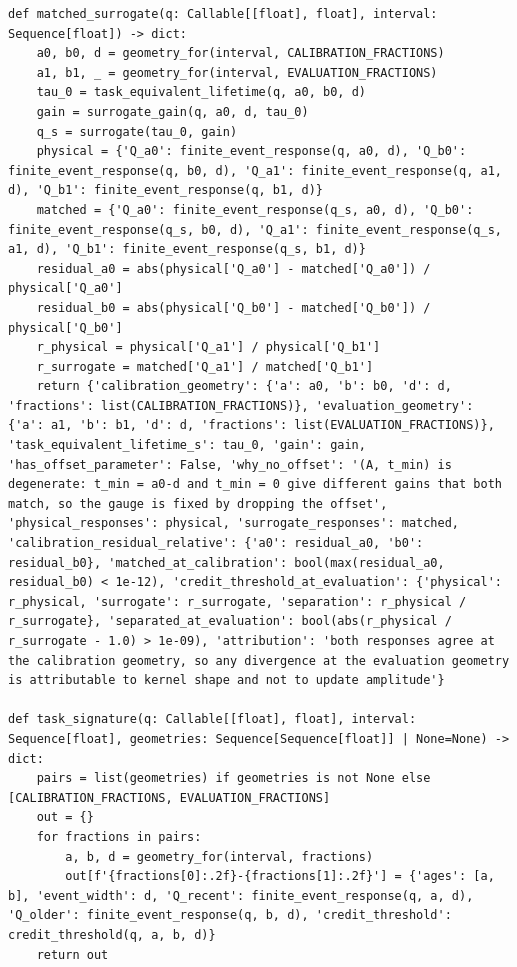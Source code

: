 \documentclass[a4paper,10pt]{article}
\begin{document}
\begin{Verbatim}
def matched_surrogate(q: Callable[[float], float], interval: Sequence[float]) -> dict:
    a0, b0, d = geometry_for(interval, CALIBRATION_FRACTIONS)
    a1, b1, _ = geometry_for(interval, EVALUATION_FRACTIONS)
    tau_0 = task_equivalent_lifetime(q, a0, b0, d)
    gain = surrogate_gain(q, a0, d, tau_0)
    q_s = surrogate(tau_0, gain)
    physical = {'Q_a0': finite_event_response(q, a0, d), 'Q_b0': finite_event_response(q, b0, d), 'Q_a1': finite_event_response(q, a1, d), 'Q_b1': finite_event_response(q, b1, d)}
    matched = {'Q_a0': finite_event_response(q_s, a0, d), 'Q_b0': finite_event_response(q_s, b0, d), 'Q_a1': finite_event_response(q_s, a1, d), 'Q_b1': finite_event_response(q_s, b1, d)}
    residual_a0 = abs(physical['Q_a0'] - matched['Q_a0']) / physical['Q_a0']
    residual_b0 = abs(physical['Q_b0'] - matched['Q_b0']) / physical['Q_b0']
    r_physical = physical['Q_a1'] / physical['Q_b1']
    r_surrogate = matched['Q_a1'] / matched['Q_b1']
    return {'calibration_geometry': {'a': a0, 'b': b0, 'd': d, 'fractions': list(CALIBRATION_FRACTIONS)}, 'evaluation_geometry': {'a': a1, 'b': b1, 'd': d, 'fractions': list(EVALUATION_FRACTIONS)}, 'task_equivalent_lifetime_s': tau_0, 'gain': gain, 'has_offset_parameter': False, 'why_no_offset': '(A, t_min) is degenerate: t_min = a0-d and t_min = 0 give different gains that both match, so the gauge is fixed by dropping the offset', 'physical_responses': physical, 'surrogate_responses': matched, 'calibration_residual_relative': {'a0': residual_a0, 'b0': residual_b0}, 'matched_at_calibration': bool(max(residual_a0, residual_b0) < 1e-12), 'credit_threshold_at_evaluation': {'physical': r_physical, 'surrogate': r_surrogate, 'separation': r_physical / r_surrogate}, 'separated_at_evaluation': bool(abs(r_physical / r_surrogate - 1.0) > 1e-09), 'attribution': 'both responses agree at the calibration geometry, so any divergence at the evaluation geometry is attributable to kernel shape and not to update amplitude'}

def task_signature(q: Callable[[float], float], interval: Sequence[float], geometries: Sequence[Sequence[float]] | None=None) -> dict:
    pairs = list(geometries) if geometries is not None else [CALIBRATION_FRACTIONS, EVALUATION_FRACTIONS]
    out = {}
    for fractions in pairs:
        a, b, d = geometry_for(interval, fractions)
        out[f'{fractions[0]:.2f}-{fractions[1]:.2f}'] = {'ages': [a, b], 'event_width': d, 'Q_recent': finite_event_response(q, a, d), 'Q_older': finite_event_response(q, b, d), 'credit_threshold': credit_threshold(q, a, b, d)}
    return out


\end{Verbatim}
\end{document}

